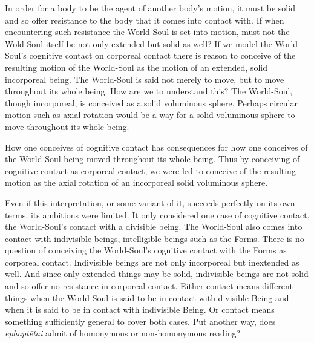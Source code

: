 

In order for a body to be the agent of another body's motion, it must be solid and so offer resistance to the body that it comes into contact with. If when encountering such resistance the World-Soul is set into motion, must not the Wold-Soul itself be not only extended but solid as well? If we model the World-Soul's cognitive contact on corporeal contact there is reason to conceive of the resulting motion of the World-Soul as the motion of an extended, solid incorporeal being. The World-Soul is said not merely to move, but to move throughout its whole being. How are we to understand this? The World-Soul, though incorporeal, is conceived as a solid voluminous sphere. Perhaps circular motion such as axial rotation would be a way for a solid voluminous sphere to move throughout its whole being.  

How one conceives of cognitive contact has consequences for how one conceives of the World-Soul being moved throughout its whole being. Thus by conceiving of cognitive contact as corporeal contact, we were led to conceive of the resulting motion as the axial rotation of an incorporeal solid voluminous sphere.

Even if this interpretation, or some variant of it, succeeds perfectly on its own terms, its ambitions were limited. It only considered one case of cognitive contact, the World-Soul's contact with a divisible being. The World-Soul also comes into contact with indivisible beings, intelligible beings such as the Forms. There is no question of conceiving the World-Soul's cognitive contact with the Forms as corporeal contact. Indivisible beings are not only incorporeal but inextended as well. And since only extended things may be solid, indivisible beings are not solid and so offer no resistance in corporeal contact. Either contact means different things when the World-Soul is said to be in contact with divisible Being and when it is said to be in contact with indivisible Being. Or contact means something sufficiently general to cover both cases. Put another way, does \emph{ephaptētai} admit of homonymous or non-homonymous reading?

